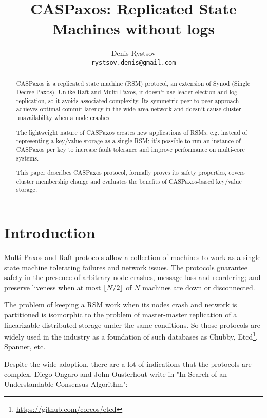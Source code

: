 \documentclass[12pt]{article}
\theoremstyle{definition}
\DeclarePairedDelimiter{\floor}{\lfloor}{\rfloor}
\begin{document}
\title{CASPaxos: Replicated State Machines without logs}

\author{Denis Rystsov\\\texttt{rystsov.denis@gmail.com}}

\maketitle

\begin{abstract}
CASPaxos is a replicated state machine (RSM) protocol, an extension of Synod (Single Decree Paxos). Unlike Raft and Multi-Paxos, it doesn't use leader election and log replication, so it avoids associated complexity. Its symmetric peer-to-peer approach achieves optimal commit latency in the wide-area network and doesn't cause cluster unavailability when a node crashes.

The lightweight nature of CASPaxos creates new applications of RSMs, e.g. instead of representing a key/value storage as a single RSM; it's possible to run an instance of CASPaxos per key to increase fault tolerance and improve performance on multi-core systems.

This paper describes CASPaxos protocol, formally proves its safety properties, covers cluster membership change and evaluates the benefits of CASPaxos-based key/value storage.
\end{abstract}

\section{Introduction}

Multi-Paxos\cite{lamport01} and Raft\cite{raft} protocols allow a collection of machines to work as a single state machine tolerating failures and network issues. The protocols guarantee safety in the presence of arbitrary node crashes, message loss and reordering; and preserve liveness when at most $\floor{N/2}$ of $N$ machines are down or disconnected.

The problem of keeping a RSM work when its nodes crash and network is partitioned is isomorphic to the problem of master-master replication of a linearizable distributed storage under the same conditions. So those protocols are widely used in the industry as a foundation of such databases as Chubby\cite{chubby}, Etcd\footnote{\href{https://github.com/coreos/etcd}{https://github.com/coreos/etcd}}, Spanner\cite{spanner}, etc.

Despite the wide adoption, there are a lot of indications that the protocols are complex. Diego Ongaro and John Ousterhout write in "In Search of an Understandable Consensus Algorithm"\cite{raft}:
\end{document}
